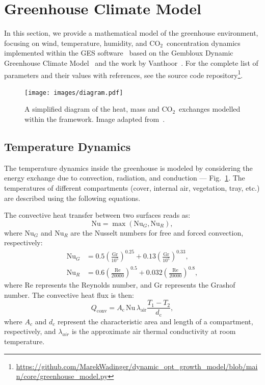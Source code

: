 \documentclass[conference]{IEEEtran}
\newcommand{\coo}{\ensuremath{\mathrm{CO_2}}}
\begin{document}
\section{Greenhouse Climate Model}\label{sec:greenhouse}
In this section, we provide a mathematical model of the greenhouse environment, focusing on wind, temperature, humidity, and \coo\ concentration dynamics implemented within the GES software~\cite{rmward61_2019} based on the Gembloux Dynamic Greenhouse Climate Model~\cite{GDGCM} and the work by Vanthoor~\cite{Vanthoor2011}. For the complete list of parameters and their values with references, see the source code repository\footnote{\url{https://github.com/MarekWadinger/dynamic_opt_growth_model/blob/main/core/greenhouse_model.py}}.

\begin{figure}
    \centering
    \texttt{[image: images/diagram.pdf]}
    \caption{A simplified diagram of the heat, mass and \coo\ exchanges modelled within the framework. Image adapted from~\cite{rmward61_2019}.}\label{fig:diagram}
\end{figure}

\subsection{Temperature Dynamics}\label{subsec:temperature}

The temperature dynamics inside the greenhouse is modeled by considering the energy exchange due to convection, radiation, and conduction --- Fig.~\ref{fig:diagram}. The temperatures of different compartments (cover, internal air, vegetation, tray, etc.) are described using the following equations.

The convective heat transfer between two surfaces reads as:
\begin{equation}
    \text{Nu} = \max \left( \text{Nu}_G, \text{Nu}_R \right),
\end{equation}
where \(\text{Nu}_G\) and \(\text{Nu}_R\) are the Nusselt numbers for free and forced convection, respectively:
\begin{align}
    \text{Nu}_G & = 0.5  {\left( \frac{\text{Gr}}{10^5} \right)}^{0.25} + 0.13  {\left(\frac{\text{Gr}}{10^5}\right)}^{0.33}, \\
    \text{Nu}_R & = 0.6  {\left(\frac{\text{Re}}{20000}\right)}^{0.5} + 0.032  {\left(\frac{\text{Re}}{20000}\right)}^{0.8},
\end{align}
where Re represents the Reynolds number, and Gr represents the Grashof number. The convective heat flux is then:
\begin{equation}
    Q_{\text{conv}} = A_{\text{c}}\, \text{Nu}\, \lambda_{\text{air}} \frac{T_1 - T_2}{d_{\text{c}}},
\end{equation}
where \(A_c\) and \(d_c\) represent the characteristic area and length of a compartment, respectively, and \(\lambda_{air}\) is the approximate air thermal conductivity at room temperature.
\end{document}
